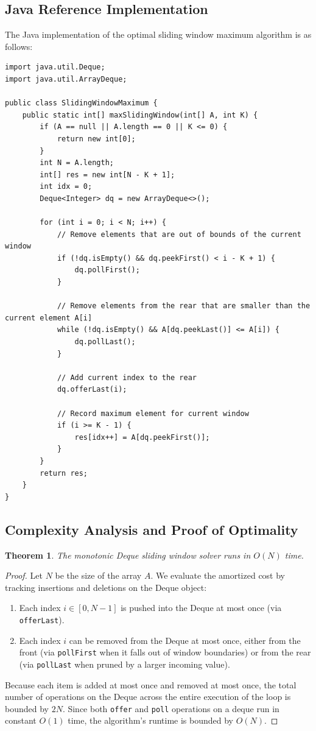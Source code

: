 \documentclass[10pt,journal,compsoc,onecolumn]{IEEEtran}
\newtheorem{theorem}{Theorem}
\begin{document}
\subsection{Java Reference Implementation}
The Java implementation of the optimal sliding window maximum algorithm is as follows:
\begin{verbatim}
import java.util.Deque;
import java.util.ArrayDeque;

public class SlidingWindowMaximum {
    public static int[] maxSlidingWindow(int[] A, int K) {
        if (A == null || A.length == 0 || K <= 0) {
            return new int[0];
        }
        int N = A.length;
        int[] res = new int[N - K + 1];
        int idx = 0;
        Deque<Integer> dq = new ArrayDeque<>();

        for (int i = 0; i < N; i++) {
            // Remove elements that are out of bounds of the current window
            if (!dq.isEmpty() && dq.peekFirst() < i - K + 1) {
                dq.pollFirst();
            }

            // Remove elements from the rear that are smaller than the current element A[i]
            while (!dq.isEmpty() && A[dq.peekLast()] <= A[i]) {
                dq.pollLast();
            }

            // Add current index to the rear
            dq.offerLast(i);

            // Record maximum element for current window
            if (i >= K - 1) {
                res[idx++] = A[dq.peekFirst()];
            }
        }
        return res;
    }
}
\end{verbatim}

\subsection{Complexity Analysis and Proof of Optimality}
\begin{theorem}
The monotonic Deque sliding window solver runs in $O(N)$ time.
\end{theorem}
\begin{proof}
Let $N$ be the size of the array $A$. We evaluate the amortized cost by tracking insertions and deletions on the Deque object:
\begin{enumerate}
    \item Each index $i \in [0, N-1]$ is pushed into the Deque at most once (via \texttt{offerLast}).
    \item Each index $i$ can be removed from the Deque at most once, either from the front (via \texttt{pollFirst} when it falls out of window boundaries) or from the rear (via \texttt{pollLast} when pruned by a larger incoming value).
\end{enumerate}
Because each item is added at most once and removed at most once, the total number of operations on the Deque across the entire execution of the loop is bounded by $2N$. Since both \texttt{offer} and \texttt{poll} operations on a deque run in constant $O(1)$ time, the algorithm's runtime is bounded by $O(N)$.
\end{proof}
\end{document}
